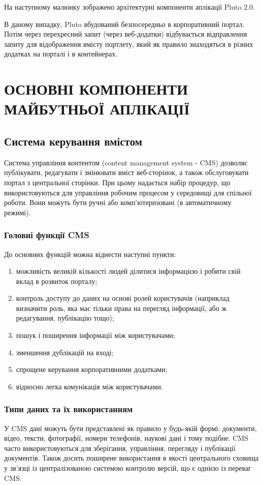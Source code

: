 На наступному малюнку зображено архітектурні компоненти аплікації Pluto 2.0. 
\par В даному випадку, Pluto вбудований безпосередньо в корпоративний портал. 
Потім через перехресний запит (через веб-додатки) відбувається відправлення запиту для відображення вмісту портлету, який як правило знаходяться в різних додатках на порталі і в контейнерах. 

\section{ОСНОВНІ КОМПОНЕНТИ МАЙБУТНЬОЇ АПЛІКАЦІЇ}

\subsection{Система керування вмістом}
Система управління контентом (content management system - CMS) дозволяє публікувати, редагувати і змінювати вміст веб-сторінок, а також обслуговувати портал з центральної сторінки. 
При цьому надається набір процедур, що використовуються для управління робочим процесом у середовищі для спільної роботи.
Вони можуть бути ручні або комп'ютеризовані (в автоматичному режимі).
\subsubsection{Головні функції CMS}
До основних функцій можна віднести наступні пункти:
\begin{enumerate}
\item можливість великій кількості людей ділитися інформацією і робити свій вклад в розвиток порталу;
\item контроль доступу до даних на основі ролей користувачів (наприклад визначити роль, яка має тільки права на перегляд інформації, або ж редагування, публікацію тощо);
\item пошук і поширення інформації між користувачами;
\item зменшення дублікацій на вході;
\item спрощене керування корпоративними додатками;
\item відносно легка комунікація між користувачами.
\end{enumerate}

\subsubsection{Типи даних та їх використанням}
У CMS дані можуть бути представлені як правило у будь-якій формі: документи, відео, тексти, фотографії, номери телефонів, наукові дані і тому подібне. 
CMS часто використовуються для зберігання, управління, перегляду і публікації документів. 
Також досить поширене використання в якості центрального сховища у зв'язці із централізованою системою контролю версій, що є однією із переваг CMS.
